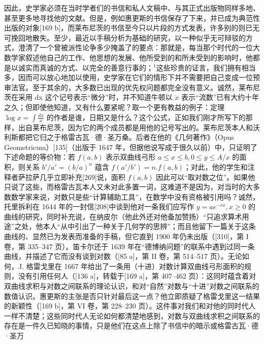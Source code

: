 因此，史学家必须在当时学者们的书信和私人文稿中、与其正式出版物同样多地、甚至更多地寻找他的文献。但是，例如惠更斯的书信保存了下来，并已成为典范性出版的对象{[}169 b{]}，而莱布尼茨的书信至今只以片段的方式发表，许多别的则已无可挽回地散失。至少，最近以手稿分析为基础的研究，以一种似乎无可辩驳的方式，澄清了一个曾被派性论争多少掩盖了的要点：那就是，每当那个时代的一位大数学家叙述他自己的工作、他思想的发展、他所受到的和所未受到的影响时，他都是以诚实而真诚的方式、以完全的善意行事的；\(^{1}\)这些珍贵的证言，我们拥有相当多，因而可以放心地加以使用，史学家在它们的情形下并不需要把自己变成一位预审法官。至于其余的，大多数已出现的优先权问题都完全没有意义。诚然，莱布尼茨在采用 dx 这个记号表示“微分”时，并不知道牛顿以 \(\dot{x}\) 表示“流数”已有大约十年之久；但即使他知道，又有什么要紧呢？取一个更有教益的例子：定理 \(\log x = \int \frac{dx}{x}\) 的作者是谁，日期又是什么？这个公式，正如我们刚才所写下的那样，出自莱布尼茨，因为它的两个成员都是用他的记号写出的。莱布尼茨本人和沃利斯都把它归之于格雷古瓦·德·圣万桑。后者在他的《几何著作》（Opus Geometricum）{[}135{]}（出版于 1647 年，但据他说写成于很久以前）中，只证明了下述命题的等价物：若 \(f(a,b)\) 表示双曲线弓形 \(a \leq x \leq b, 0 \leq y \leq A/x\) 的面积，则关系 \(b'/a' = (b/a)^n\) 蕴含 \(f(a'/b') = n.f(a,b)\)；对此，他的学生和注释者萨拉萨几乎立即补充{[}269{]}说，面积 \(f(a,b)\) 因此可以“取对数之位”。如果他只说了这些，而格雷古瓦本人又未对此多置一词，这难道不是因为，对当时的大多数数学家来说，对数只是些“计算辅助工具”，在数学中没有资格被引用吗？诚然，托里拆利在 1644 年的一封信{[}208{]}中谈到他对一条我们应写作 \(y = ae^{-cx}, x \geq 0\) 的曲线的研究，同时补充说，在纳皮尔（他此外还对他备加赞扬）“只追求算术用途”之处，他本人“从中引出了一种关于几何学的思辨”；而且他留下一篇关于这条曲线的、显然已为发表而准备的手稿，但它直到 1900 年仍未出版（{[}310{]}，第 I 卷，第 335–347 页）。笛卡尔还于 1639 年在“德博纳问题”的联系中遇到过同一条曲线，并描述了它而没有谈到对数（{[}85 a{]}，第 II 卷，第 514–517 页）。无论如何，J. 格雷戈里在 1667 年给出了一条用（十进）对数计算双曲线弓形面积的规则，没有引用任何人（{[}136 a{]}，转载于{[}169 a{]}，第 407–462 页）：这同时蕴含着对双曲线求积与对数之间联系的理论认识，和对“自然”对数与“十进”对数之间联系的数值认识。惠更斯的主张是否只针对最后这一点？他立即质疑了格雷戈里这一结果的新颖性（{[}169 b{]}，第 VI 卷，第 228–230 页）。这件事对我们和对他的同时代人一样不清楚；这些同时代人无论如何都清楚地感到，对数与双曲线求积之间联系的存在是一件久已知晓的事情，只是他们在这点上除了书信中的暗示或格雷古瓦·德·圣万

